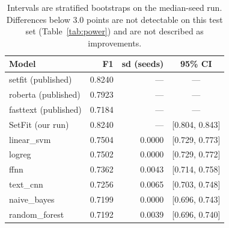 \begin{table}[htbp]
\centering
\caption{Cross-repository F1. Our models are the mean of five seeds.}
\label{tab:main}
\begin{tabular}{lrrc}
\toprule
Model & F1 & sd (seeds) & 95\% CI \\
\midrule
setfit (published) & 0.8240 & --- & --- \\
roberta (published) & 0.7923 & --- & --- \\
fasttext (published) & 0.7184 & --- & --- \\
\midrule
SetFit (our run) & 0.8240 & --- & [0.804, 0.843] \\
linear\_svm & 0.7504 & 0.0000 & [0.729, 0.773] \\
logreg & 0.7502 & 0.0000 & [0.729, 0.772] \\
ffnn & 0.7362 & 0.0043 & [0.714, 0.758] \\
text\_cnn & 0.7256 & 0.0065 & [0.703, 0.748] \\
naive\_bayes & 0.7199 & 0.0000 & [0.696, 0.743] \\
random\_forest & 0.7192 & 0.0039 & [0.696, 0.740] \\
\bottomrule
\end{tabular}
\caption*{\footnotesize Intervals are stratified bootstraps on the median-seed run. Differences below 3.0 points are not detectable on this test set (Table~\ref{tab:power}) and are not described as improvements.}
\end{table}
